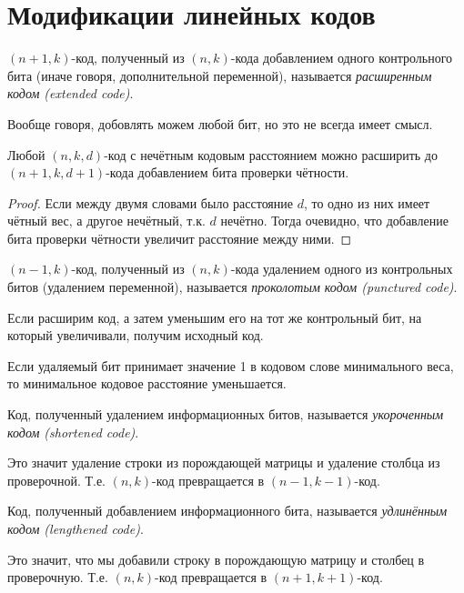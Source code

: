 \section{Модификации линейных кодов}
\begin{definition}
$\left(n+1,k\right)$-код, полученный из $\left(n,k\right)$-кода
добавлением одного контрольного бита (иначе говоря, дополнительной
переменной), называется \emph{расширенным кодом (extended code)}.
\end{definition}
Вообще говоря, добовлять можем любой бит, но это не всегда имеет смысл.
\begin{proposition}
Любой $\left(n,k,d\right)$-код с нечётным кодовым расстоянием можно
расширить до $\left(n+1,k,d+1\right)$-кода добавлением бита проверки
чётности.\end{proposition}
\begin{proof}
Если между двумя словами было расстояние $d$, то одно из них имеет
чётный вес, а другое нечётный, т.к. $d$ нечётно. Тогда очевидно,
что добавление бита проверки чётности увеличит расстояние между ними.\end{proof}
\begin{definition}
$\left(n-1,k\right)$-код, полученный из $\left(n,k\right)$-кода
удалением одного из контрольных битов (удалением переменной), называется
\emph{проколотым кодом (punctured code)}.
\end{definition}
Если расширим код, а затем уменьшим его на тот же контрольный бит,
на который увеличивали, получим исходный код.



Если удаляемый бит принимает значение 1 в кодовом слове минимального
веса, то минимальное кодовое расстояние уменьшается.


\begin{definition}
Код, полученный удалением информационных битов, называется \emph{укороченным
кодом (shortened code)}.
\end{definition}
Это значит удаление строки из порождающей матрицы и удаление столбца
из проверочной. Т.е. $\left(n,k\right)$-код превращается в $\left(n-1,k-1\right)$-код.
\begin{definition}
Код, полученный добавлением информационного бита, называется \emph{удлинённым
кодом (lengthened code)}.
\end{definition}
Это значит, что мы добавили строку в порождающую матрицу и столбец
в проверочную. Т.е. $\left(n,k\right)$-код превращается в $\left(n+1,k+1\right)$-код.

